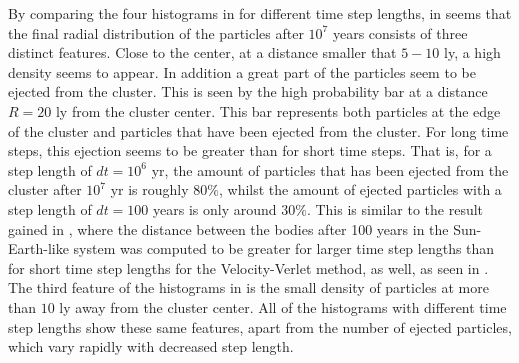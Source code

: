 By comparing the four histograms in  for different time step lengths, in seems that the final radial distribution of the particles after $10^7$ years consists of three distinct features. Close to the center, at a distance smaller that $5-10$ ly, a high density seems to appear. 
In addition a great part of the particles seem to be ejected from the cluster. 
This is seen by the high probability bar at a distance $R=20$ ly from the cluster center. This bar represents both particles at the edge of the cluster and particles that have been ejected from the cluster. 
For long time steps, this ejection seems to be greater than for short time steps.
That is, for a step length of $dt = 10^6$ yr, the amount of particles that has been ejected from the cluster after $10^7$ yr is roughly $80 \%$, whilst the amount of ejected particles with a step length of $dt = 100$ years is only around $30 \%$.
This is similar to the result gained in , where the distance between the bodies after 100 years in the Sun-Earth-like system was computed to be greater for larger time step lengths than for short time step lengths for the Velocity-Verlet method, as well, as seen in . 
The third feature of the histograms in  is the small density of particles at more than $10$ ly away from the cluster center.
All of the histograms with different time step lengths show these same features, apart from the number of ejected particles, which vary rapidly with decreased step length. 
